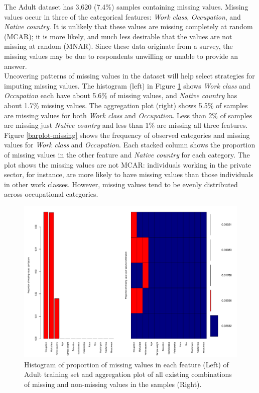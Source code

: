 \documentclass[12pt]{article}
\begin{document}
The Adult dataset has 3,620 (7.4\%) samples containing missing values. Missing values occur in three of the categorical features: \textit{Work class}, \textit{Occupation}, and \textit{Native country}. It is unlikely that these values are missing completely at random (MCAR); it is more likely, and much less desirable that the values are not missing at random (MNAR). Since these data originate from a survey, the missing values may be due to respondents unwilling or unable to provide an answer.  \\

Uncovering patterns of missing values in the dataset will help select strategies for imputing missing values. The histogram (left) in Figure \ref{proportion-missing} shows \textit{Work class} and \textit{Occupation} each have about 5.6\% of missing values, and \textit{Native country} has about 1.7\% missing values. The aggregation plot (right) shows 5.5\% of samples are missing values for both \textit{Work class} and \textit{Occupation}. Less than 2\% of samples are missing just \textit{Native country} and less than 1\% are missing all three features.\\

Figure \ref{barplot-missing} shows the frequency of observed categories and missing values for \textit{Work class} and \textit{Occupation}. Each stacked column shows the proportion of missing values in the other feature and \textit{Native country} for each category. The plot shows the missing values are not MCAR: individuals working in the private sector, for instance, are more likely to have missing values than those individuals in other work classes. However, missing values tend to be evenly distributed across occupational categories. 

\begin{figure}[htbp] 
   \centering
   \includegraphics[scale=.6]{proportion-missing.pdf} 
   \caption{Histogram of proportion of missing values in each feature (Left) of Adult training set and aggregation plot of all existing combinations of missing and non-missing values in the samples (Right).}
   \label{proportion-missing}
\end{figure}
\end{document}
